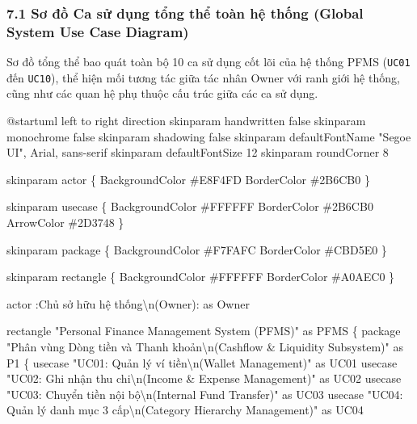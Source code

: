 \documentclass[11pt,a4paper]{article}
\newenvironment{Shaded}{}{}
\newcommand{\NormalTok}[1]{#1}
\begin{document}
\subsubsection{7.1 Sơ đồ Ca sử dụng tổng thể toàn hệ thống (Global
System Use Case
Diagram)}\label{71-sux1a1-ux111ux1ed3-ca-sux1eed-dux1ee5ng-tux1ed5ng-thux1ec3-touxe0n-hux1ec7-thux1ed1ng-global-system-use-case-diagram}

Sơ đồ tổng thể bao quát toàn bộ 10 ca sử dụng cốt lõi của hệ thống PFMS
(\texttt{UC01} đến \texttt{UC10}), thể hiện mối tương tác giữa tác nhân
Owner với ranh giới hệ thống, cũng như các quan hệ phụ thuộc cấu trúc
giữa các ca sử dụng.

\iffalse
\begin{Shaded}
\begin{Highlighting}[]
\NormalTok{@startuml}
\NormalTok{left to right direction}
\NormalTok{skinparam handwritten false}
\NormalTok{skinparam monochrome false}
\NormalTok{skinparam shadowing false}
\NormalTok{skinparam defaultFontName "Segoe UI", Arial, sans{-}serif}
\NormalTok{skinparam defaultFontSize 12}
\NormalTok{skinparam roundCorner 8}

\NormalTok{skinparam actor \{}
\NormalTok{    BackgroundColor \#E8F4FD}
\NormalTok{    BorderColor \#2B6CB0}
\NormalTok{\}}

\NormalTok{skinparam usecase \{}
\NormalTok{    BackgroundColor \#FFFFFF}
\NormalTok{    BorderColor \#2B6CB0}
\NormalTok{    ArrowColor \#2D3748}
\NormalTok{\}}

\NormalTok{skinparam package \{}
\NormalTok{    BackgroundColor \#F7FAFC}
\NormalTok{    BorderColor \#CBD5E0}
\NormalTok{\}}

\NormalTok{skinparam rectangle \{}
\NormalTok{    BackgroundColor \#FFFFFF}
\NormalTok{    BorderColor \#A0AEC0}
\NormalTok{\}}

\NormalTok{actor :Chủ sở hữu hệ thống\textbackslash{}n(Owner): as Owner}

\NormalTok{rectangle "Personal Finance Management System (PFMS)" as PFMS \{}
\NormalTok{    package "Phân vùng Dòng tiền và Thanh khoản\textbackslash{}n(Cashflow \& Liquidity Subsystem)" as P1 \{}
\NormalTok{        usecase "UC01: Quản lý ví tiền\textbackslash{}n(Wallet Management)" as UC01}
\NormalTok{        usecase "UC02: Ghi nhận thu chi\textbackslash{}n(Income \& Expense Management)" as UC02}
\NormalTok{        usecase "UC03: Chuyển tiền nội bộ\textbackslash{}n(Internal Fund Transfer)" as UC03}
\NormalTok{        usecase "UC04: Quản lý danh mục 3 cấp\textbackslash{}n(Category Hierarchy Management)" as UC04}
        

\end{Highlighting}
\end{Shaded}
\end{document}
